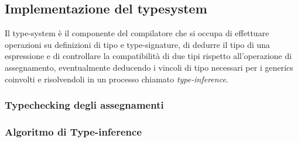 \subsection{Implementazione del typesystem}
Il type-system è il componente del compilatore che si occupa di effettuare operazioni su definizioni di tipo e 
type-signature, di dedurre il tipo di una espressione e di controllare la compatibilità di due tipi rispetto 
all'operazione di assegnamento, eventualmente deducendo i vincoli di tipo necessari per i generics coinvolti e risolvendoli
in un processo chiamato \textit{type-inference}.




\subsubsection{Typechecking degli assegnamenti}
\subsubsection{Algoritmo di Type-inference}